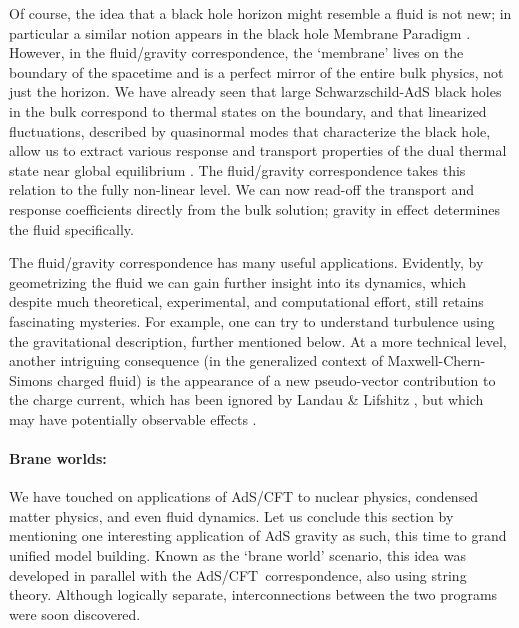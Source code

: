 \documentclass[12pt]{article}
\def\AC{AdS/CFT}
\def\schw{Schwarzschild}
\begin{document}
Of course, the idea that a black hole horizon might resemble a fluid is not new; in particular a similar notion appears in the black hole Membrane Paradigm \cite{Price:1986yy,Damour:1978cg}.  However, in the fluid/gravity correspondence, the `membrane' lives on the boundary of the spacetime and is a perfect mirror of the entire bulk physics, not just the horizon.  
We have already seen that large \schw-AdS black holes in the bulk correspond to thermal states on the boundary, and that linearized fluctuations, described by quasinormal modes that characterize the black hole, allow us to extract various response and transport properties of the dual thermal state near global equilibrium \cite{Policastro:2001yc}.  The fluid/gravity correspondence \cite{Bhattacharyya:2008jc} takes this relation to the fully non-linear level.  We can now read-off the transport and response coefficients directly from the bulk solution; gravity in effect determines the fluid specifically.  


The fluid/gravity correspondence has many useful applications.  Evidently, by geometrizing the fluid we can gain further insight into its dynamics, which despite much theoretical, experimental, and computational effort, still retains fascinating mysteries.  For example, one can try to understand turbulence using the gravitational description, further mentioned below.
At a more technical level, another intriguing consequence (in the generalized context of Maxwell-Chern-Simons charged fluid) is the appearance of a new pseudo-vector contribution to the charge current, which has been ignored by 
Landau \& Lifshitz \cite{Landau:1965uq}, but which may have potentially observable effects \cite{Son:2009tf}.  

\paragraph{Brane worlds:}  %
We have touched on applications of AdS/CFT to nuclear physics, condensed matter physics, and even fluid dynamics.   Let us conclude this section by mentioning one interesting  application of AdS gravity as such, this time to grand unified model building.  Known as the `brane world' scenario, this idea was developed in parallel with the \AC\ correspondence, also using string theory.  Although logically separate,  interconnections between the two programs were soon discovered.
\end{document}
